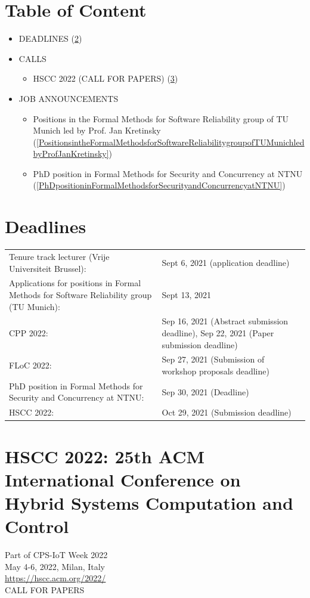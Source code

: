 \documentclass[prodmode,acmtecs]{acmsmall} %
\begin{document}
\section{Table of Content}\begin{itemize}\item DEADLINES (\cref{deadlines}) 
 
\item CALLS 
 
\begin{itemize}\item HSCC 2022 (CALL FOR PAPERS) (\cref{HSCC2022})
\end{itemize} 
\item JOB ANNOUNCEMENTS 
 
\begin{itemize}\item Positions in the Formal Methods for Software Reliability group of TU Munich led by Prof. Jan Kretinsky (\cref{PositionsintheFormalMethodsforSoftwareReliabilitygroupofTUMunichledbyProfJanKretinsky})
\item PhD position in Formal Methods for Security and Concurrency at NTNU (\cref{PhDpositioninFormalMethodsforSecurityandConcurrencyatNTNU})
\end{itemize} 
\end{itemize}\section{Deadlines}\label{deadlines}\begin{tabulary}{\linewidth}{LL}Tenure track lecturer (Vrije Universiteit Brussel):  & Sept 6, 2021 (application deadline) \\
Applications for positions in Formal Methods for Software Reliability group (TU Munich):  & Sept 13, 2021 \\
CPP 2022:  & Sep 16, 2021 (Abstract submission deadline), Sep 22, 2021 (Paper submission deadline) \\
FLoC 2022:  & Sep 27, 2021 (Submission of workshop proposals deadline) \\
PhD position in Formal Methods for Security and Concurrency at NTNU:  & Sep 30, 2021 (Deadline) \\
HSCC 2022:  & Oct 29, 2021 (Submission deadline) \\
\end{tabulary}
\section{HSCC 2022: 25th ACM International Conference on Hybrid Systems Computation and Control }\label{HSCC2022}  Part of CPS-IoT Week 2022\\ 
  May 4-6, 2022, Milan, Italy\\ 
  \href{https://hscc.acm.org/2022/}{https://hscc.acm.org/2022/}\\ 
CALL FOR PAPERS 
\end{document}
